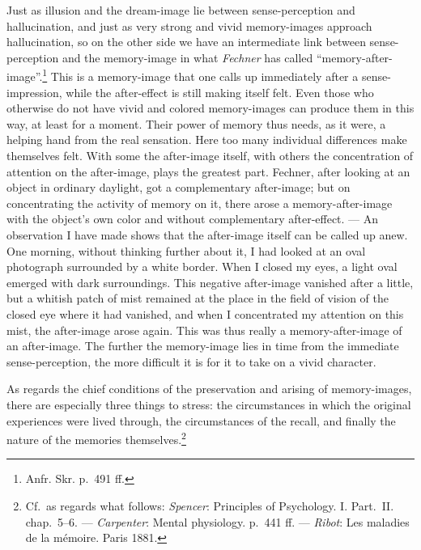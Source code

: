 \documentclass[12pt,a4paper]{book}
\newcommand{\opage}[1]{\marginnote{\footnotesize\textit{[#1]}}}
\begin{document}
Just as illusion and the dream-image lie between sense-perception and
hallucination, and just as very strong
\opage{180}and vivid memory-images approach hallucination, so on the other
side we have an intermediate link between sense-perception and the
memory-image in what \emph{Fechner} has called
``memory-after-image''.\footnote{Anfr. Skr. p.~491 ff.} This is a
memory-image that one calls up immediately after a sense-impression, while
the after-effect is still making itself felt. Even those who otherwise do
not have vivid and colored memory-images can produce them in this way, at
least for a moment. Their power of memory thus needs, as it were, a
helping hand from the real sensation. Here too many individual differences
make themselves felt. With some the after-image itself, with others the
concentration of attention on the after-image, plays the greatest part.
Fechner, after looking at an object in ordinary daylight, got a
complementary after-image; but on concentrating the activity of memory on
it, there arose a memory-after-image with the object's own color and
without complementary after-effect. --- An observation I have made shows
that the after-image itself can be called up anew. One morning, without
thinking further about it, I had looked at an oval photograph surrounded
by a white border. When I closed my eyes, a light oval emerged with dark
surroundings. This negative after-image vanished after a little, but a
whitish patch of mist remained at the place in the field of vision of the
closed eye where it had vanished, and when I concentrated my attention on
this mist, the after-image arose again. This was thus really a
memory-after-image of an after-image. The further the memory-image lies in
time from the immediate sense-perception, the more difficult it is for it
to take on a vivid character.

As regards the chief conditions of the preservation and arising of
memory-images, there are especially three things to stress: the
circumstances in which the original experiences were lived through, the
circumstances of the recall, and finally the nature of the memories
themselves.\footnote{Cf.\ as regards what follows: \emph{Spencer}:
Principles of Psychology. I. Part.~II. chap.~5--6. --- \emph{Carpenter}:
Mental physiology. p.~441 ff. --- \emph{Ribot}: Les maladies de la
mémoire. Paris 1881.}
\end{document}
